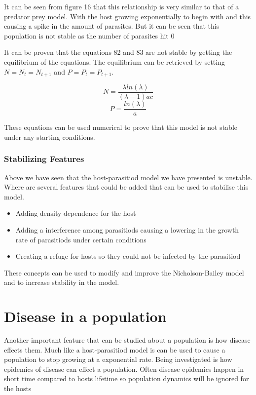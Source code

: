 \documentclass[final]{cmpreport}
\begin{document}
	It can be seen from figure 16 that this relationship is very similar to that of a predator prey model. With the host growing exponentially to begin with and this causing a spike in the  amount of parasites. But it can be seen that this population is not stable as the number of parasites hit 0

	It can be proven that the equations 82 and 83 are not stable by getting the equilibrium of the equations. The equilibrium can be retrieved by setting $N=N_t=N_{t+1}$ and $P=P_t=P_{t+1}$.
	
	\begin{equation} N= \frac{\lambda ln(\lambda)}{(\lambda - 1)ac} \end{equation}
	\begin{equation} P=\frac{ln(\lambda)}{a} \end{equation}
	
	These equations can be used numerical to prove that this model is not stable under any starting conditions.

	\subsubsection{Stabilizing Features}
	Above we have seen that the host-parasitiod model we have presented is unstable. Where are several features that could be added that can be used to stabilise this model.
	\begin{itemize}
		\item Adding density dependence for the host 
		\item Adding a interference among parasitiods causing a lowering in the growth rate of parasitiods under certain conditions
		\item Creating a refuge for hosts so they could not be infected by the parasitiod
	\end{itemize}
	These concepts can be used to modify and improve the Nicholson-Bailey model and to increase stability in the model.
	
	
	
\section{Disease in a population}
	Another important feature that can be studied about a population is how disease effects them. Much like a host-parasitiod model is can be used to cause a population to stop growing at a exponential rate. Being investigated is how epidemics of disease can effect a population. Often disease epidemics happen in short time compared to hosts lifetime so population dynamics will be ignored for the hosts
	
\end{document}
